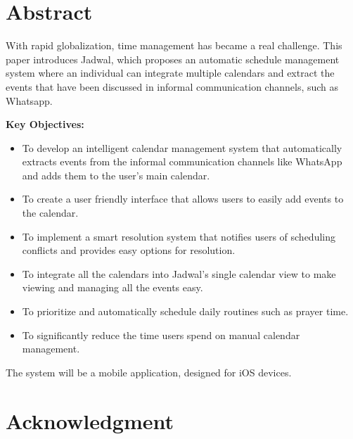 \documentclass[12pt,a4paper,twoside]{report}
\begin{document}
\cleardoublepage

\begin{singlespace}

    \chapter*{Abstract}

    \begin{justify}
        With rapid globalization, time management has became a real challenge. This paper introduces Jadwal, which proposes an automatic schedule management system where an individual can integrate multiple calendars and extract the events that have been discussed in informal communication channels, such as Whatsapp.

        \textbf{Key Objectives:}
        \begin{itemize}
            \item To develop an intelligent calendar management system that automatically extracts events from the informal communication channels like WhatsApp and adds them to the user's main calendar.
            \item To create a user friendly interface that allows users to easily add events to the calendar.
            \item To implement a smart resolution system that notifies users of scheduling conflicts and provides easy options for resolution.
            \item To integrate all the calendars into Jadwal's single calendar view to make viewing and managing all the events easy.
            \item To prioritize and automatically schedule daily routines such as prayer time.
            \item To significantly reduce the time users spend on manual calendar management.
        \end{itemize}


        \begin{center}
            The system will be a mobile application, designed for iOS devices.
        \end{center}
    \end{justify}

    \cleardoublepage

    \chapter*{Acknowledgment}


\end{singlespace}
\end{document}
